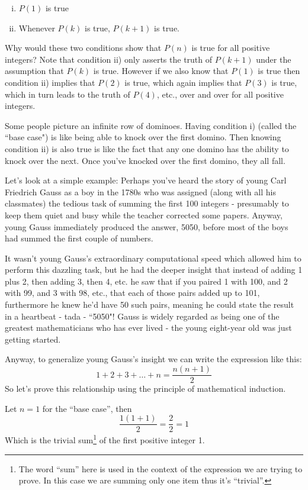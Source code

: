 \documentclass{article}
\begin{document}
\begin{enumerate}[i)]
\item $P(1)$ is true
\item Whenever $P(k)$ is true, $P(k+1)$ is true.
\end{enumerate}

Why would these two conditions show that $P(n)$ is true for all
positive integers? Note that condition ii) only asserts the truth
of $P(k+1)$ under the assumption that $P(k)$ is true.
However if we also know that $P(1)$ is true then condition ii) implies that $P(2)$ is true,
which again implies that $P(3)$ is true,
which in turn leads to the truth of $P(4)$,
etc., over and over for all positive integers.

Some people picture an infinite row of dominoes.
Having condition i) (called the ``base case") is like being
able to knock over the first domino.
Then knowing condition ii) is also true is like the
fact that any one domino has the ability to knock over the next.
Once you've knocked over the first domino,
they all fall.

Let's look at a simple example:
Perhaps you've heard the story of young Carl Friedrich Gauss
as a boy in
the 1780s who was assigned (along with all his classmates)
the tedious task of summing the first 100 integers -
presumably to keep them quiet and busy while the
teacher corrected some papers. Anyway,
young Gauss immediately produced the answer,
5050, before most of the boys had summed the first couple of numbers.

It wasn't young Gauss's extraordinary computational speed which allowed
him to perform this dazzling task,
but he had the deeper insight that instead of adding 1 plus 2,
then adding 3, then 4, etc.
he saw that if you paired 1 with 100,
and 2 with 99,
and 3 with 98,
etc.,
that each of those pairs added up to 101,
furthermore he knew he'd have 50 such pairs,
meaning he could state the result in a heartbeat - tada - ``5050"!
Gauss is widely regarded as being one of the greatest
mathematicians who has ever lived - the young eight-year old was just getting started.

\break
Anyway,
to generalize young Gauss's insight we can write the expression like this:
\[1+2+3+\ldots+n=\frac{n(n+1)}{2}\]
So let's prove this relationship using the principle of mathematical induction.
\bigskip

Let $n=1$ for the ``base case'',
then
\[\frac{1(1+1)}{2}=\frac{2}{2}=1\]
Which is the trivial sum\footnote{The word ``sum'' here is used
in the context of the expression
we are trying to prove. In this case we are summing
only one item thus it's ``trivial''.} of the first positive integer 1.
\bigskip
\end{document}
